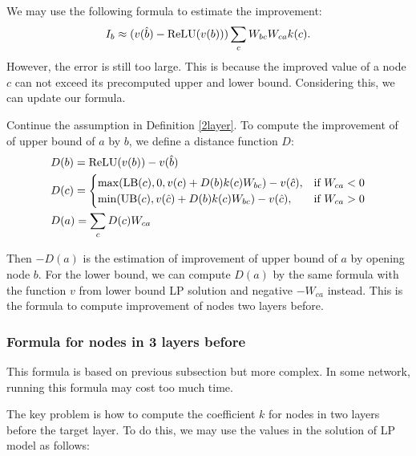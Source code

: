 We may use the following formula to estimate the improvement:  \begin{align*}
	I_b \approx (v(\hat{b})-\mathrm{ReLU}(v(b)))\sum_c W_{bc}W_{ca}k(c).
\end{align*}However, the error is still too large. This is because the improved value of a node $c$ can not exceed its precomputed upper and lower bound. Considering this, we can update our formula.

\begin{definition}
	Continue the assumption in Definition \ref{2layer}. To compute the improvement of of upper bound of $a$ by $b$, we define a distance function $D$:
	\begin{align}
		&D(b) = \mathrm{ReLU}(v(b))-v(\hat{b})\\
			&D(c) =
		\begin{cases}
			\max(\mathrm{LB}(c), 0, v(c)+D(b)k(c)W_{bc})-v(\hat{c}), & \text{if }W_{ca} < 0\\
			\min(\mathrm{UB}(c), v(\hat{c})+D(b)k(c)W_{bc})-v(\hat{c}), & \text{if }  W_{ca} > 0
		\end{cases}\\
		&D(a) = \sum_c D(c)W_{ca}
	\end{align}
\end{definition}

Then $-D(a)$ is the estimation of improvement of upper bound of $a$ by opening node $b$. For the lower bound, we can compute $D(a)$ by the same formula with the function $v$ from lower bound LP solution and negative $-W_{ca}$ instead. This is the formula to compute improvement of nodes two layers before.


\subsubsection*{Formula for nodes in 3 layers before} 

This formula is based on previous subsection but more complex. In some network, running this formula may cost too much time. 

The key problem is how to compute the coefficient $k$ for nodes in two layers before the target layer. To do this, we may use the values in the solution of LP model as follows:

